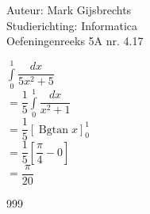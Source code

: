 \documentclass[a4paper]{article}
\newcommand{\dint}{\displaystyle\int}
\newcommand{\Bgtan}{\operatorname{Bgtan}}
\begin{document}
\noindent \large Auteur: Mark Gijsbrechts \\
\noindent \large Studierichting: Informatica\\
\noindent \large Oefeningenreeks 5A nr. 4.17\\

\medskip

\normalsize





$ \dint\limits_{0}^{1} \dfrac{dx}{5x^2 + 5} $ \\

$= \dfrac{1}{5} \dint\limits_{0}^{1} \dfrac{dx}{x^2 + 1} $ \\

$= \dfrac{1}{5} \left[ \Bgtan x \right]_{0}^{1} $ \\

$= \dfrac{1}{5} \left[ \dfrac{\pi}{4} - 0 \right] $ \\

$= \dfrac{\pi}{20} $ \\




\begin{thebibliography}{999}
\end{thebibliography}
\end{document}
